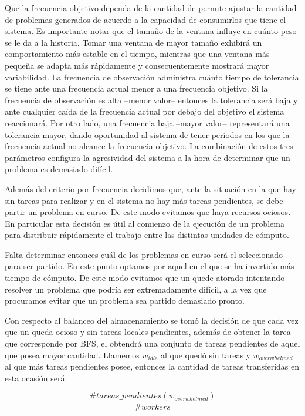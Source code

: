 Que la frecuencia objetivo dependa de la cantidad de \ws permite ajustar la
cantidad de problemas generados de acuerdo a la capacidad de consumirlos que
tiene el sistema. Es importante notar que el tamaño de la ventana influye en
cuánto peso se le da a la historia. Tomar una ventana de mayor tamaño exhibirá un comportamiento más estable en el tiempo,
mientras que una ventana más pequeña se adapta más rápidamente y consecuentemente mostrará mayor variabilidad. La frecuencia de observación administra cuánto tiempo de
tolerancia se tiene ante una frecuencia actual menor a una frecuencia
objetivo. Si la frecuencia de observación es alta --menor valor-- entonces la
tolerancia será baja y ante cualquier caída de la frecuencia actual por debajo
del objetivo el sistema reaccionará. Por otro lado, una frecuencia baja --mayor
valor-- representará una tolerancia mayor, dando oportunidad al sistema de
tener períodos en los que la frecuencia actual no alcance la frecuencia
objetivo. La combinación de estos tres parámetros configura la agresividad
del sistema a la hora de determinar que un problema es demasiado difícil.

Además del criterio por frecuencia decidimos que, ante la situación en la que hay
\ws sin tareas para realizar y en el sistema no hay más tareas pendientes, se
debe partir un problema en curso. De este modo evitamos que haya recursos
ociosos. En particular esta decisión es útil al comienzo de la ejecución de un
problema para distribuir rápidamente el trabajo entre las distintas unidades
de cómputo.

Falta determinar entonces cuál de los problemas en curso será el seleccionado
para ser partido. En este punto optamos por aquel en el que se ha
invertido más tiempo de cómputo. De este modo evitamos que un \w quede atorado
intentando resolver un problema que podría ser extremadamente difícil, a la vez
que procuramos evitar que un problema sea partido demasiado pronto.

Con respecto al balanceo del almacenamiento se tomó la decisión de que cada
vez que un \w queda ocioso y sin tareas locales pendientes, además de obtener la
tarea que corresponde por BFS, el \w obtendrá una conjunto de tareas pendientes
de aquel \w que posea mayor cantidad. Llamemos $w_{idle}$ al \w que quedó sin
tareas y $w_{overwhelmed}$ al que más tareas pendientes posee, entonces la
cantidad de tareas transferidas en esta ocasión será:

 \begin{equation}
\frac{\#tareas\_pendientes(w_{overwhelmed})}{\# workers}
\label{eq:share}
\end{equation} 

